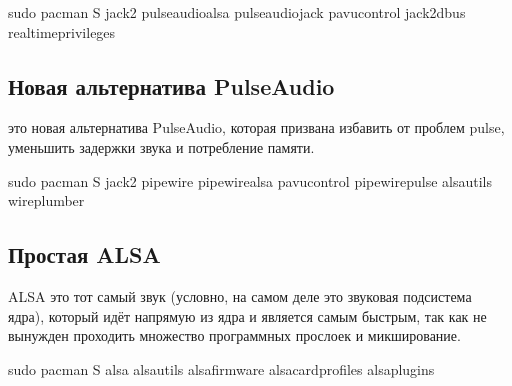 \documentclass[letterpaper,10pt,russian,openany]{sphinxmanual}
\begin{document}
\begin{sphinxVerbatim}[commandchars=\\\{\}]
sudo pacman \PYGZhy{}S jack2 pulseaudio\PYGZhy{}alsa pulseaudio\PYGZhy{}jack pavucontrol jack2\PYGZhy{}dbus realtime\PYGZhy{}privileges
\end{sphinxVerbatim}

\ignorespaces 

\subsection{Новая альтернатива PulseAudio}
\label{\detokenize{source/generic-system-acceleration:pulseaudio}}\label{\detokenize{source/generic-system-acceleration:pipewire-installation}}\label{\detokenize{source/generic-system-acceleration:index-6}}
\sphinxAtStartPar
{} \sphinxhyphen{} это новая альтернатива PulseAudio,
которая призвана избавить от проблем pulse, уменьшить задержки звука и потребление памяти.

\begin{sphinxVerbatim}[commandchars=\\\{\}]
sudo pacman \PYGZhy{}S jack2 pipewire pipewire\PYGZhy{}alsa pavucontrol pipewire\PYGZhy{}pulse alsa\PYGZhy{}utils wireplumber
\end{sphinxVerbatim}

\ignorespaces 

\subsection{Простая ALSA}
\label{\detokenize{source/generic-system-acceleration:alsa}}\label{\detokenize{source/generic-system-acceleration:index-7}}\label{\detokenize{source/generic-system-acceleration:id5}}
\sphinxAtStartPar
ALSA \sphinxhyphen{} это тот самый звук (условно, на самом деле это звуковая подсистема ядра),
который идёт напрямую из ядра и является самым быстрым,
так как не вынужден проходить множество программных прослоек и микширование.

\begin{sphinxVerbatim}[commandchars=\\\{\}]
sudo pacman \PYGZhy{}S alsa alsa\PYGZhy{}utils alsa\PYGZhy{}firmware alsa\PYGZhy{}card\PYGZhy{}profiles alsa\PYGZhy{}plugins
\end{sphinxVerbatim}
\end{document}
